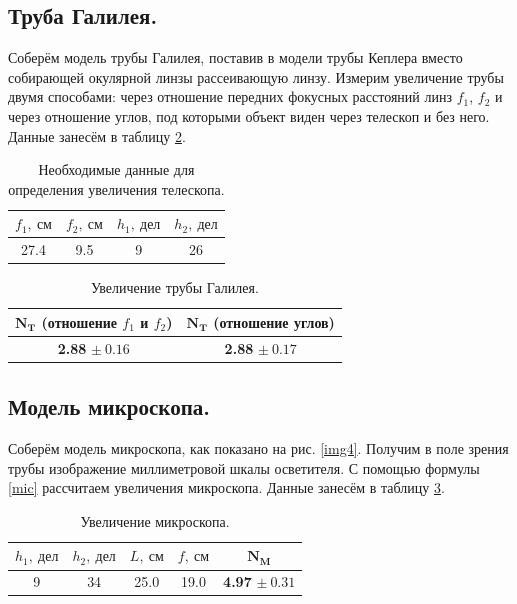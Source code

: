 \documentclass[a4paper, 12pt, twoside]{article}
\begin{document}
\subsection{Труба Галилея.}

Соберём модель трубы Галилея, поставив в модели трубы Кеплера вместо собирающей окулярной линзы рассеивающую линзу. Измерим увеличение трубы двумя способами: через отношение передних фокусных расстояний линз $f_1$, $f_2$ и через отношение углов, под которыми объект виден через телескоп и без него. Данные занесём в таблицу \ref{t8}.

\begin{table}[H]
	\centering
	\caption{Необходимые данные для определения увеличения телескопа.}
	\label{t7}
	\begin{tabular}{c|c|c|c} \toprule
		$f_1,~\text{см}$ & $f_2,~\text{см}$ & $h_1,~\text{дел}$ & $h_2,~\text{дел}$ \\ \midrule
		27.4             & 9.5              & 9                 & 26        \\ \bottomrule       
	\end{tabular}
\end{table}

\begin{table}[H]
	\centering
	\caption{Увеличение трубы Галилея.}
	\label{t8}
	\begin{tabular}{c|c} \toprule
		$\mathbf{N_T}$ (отношение $f_1$ и $f_2$) & $\mathbf{N_T}$ (отношение углов) \\ \midrule
		\textbf{2.88} $\pm~0.16$                           & \textbf{2.88} $\pm~0.17$ \\ \bottomrule                 
	\end{tabular}
\end{table}


\subsection{Модель микроскопа.}

Соберём модель микроскопа, как показано на рис. \ref{img4}. Получим в поле зрения трубы изображение миллиметровой шкалы осветителя. С помощью формулы \eqref{mic} рассчитаем увеличения микроскопа. Данные занесём в таблицу \ref{t9}.

\begin{table}[H]
	\centering
	\caption{Увеличение микроскопа.}
	\label{t9}
	\begin{tabular}{c|c|c|c|c}\toprule
		$h_1,~\text{дел}$ & $h_2,~\text{дел}$ & $L,~\text{см}$ & $f,~\text{см}$ & $\mathbf{N_M}$ \\ \midrule
		9                 & 34                & 25.0           & 19.0           & \textbf{4.97} $\pm~0.31$ \\ \bottomrule
	\end{tabular}
\end{table}
\end{document}
